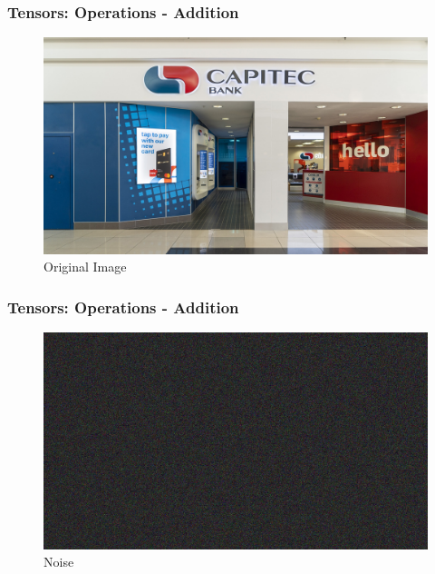 \documentclass[11pt]{beamer}
\begin{document}
\begin{frame}
	\frametitle{Tensors: Operations - Addition}
		 \begin{figure}
		\includegraphics[scale=0.17]{"1 - original_image"}
		\caption{Original Image}
	\end{figure}
\end{frame}

\begin{frame}
	\frametitle{Tensors: Operations - Addition}
	\begin{figure}
		\includegraphics[scale=0.17]{"2 - gauss_noise"}
		\caption{Noise}
	\end{figure}
\end{frame}
\end{document}
